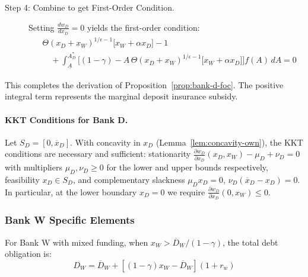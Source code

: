 \documentclass[12pt]{article}
\begin{document}
\begin{description}
    \item[Step 4: Combine to get First-Order Condition.]
    Setting $\frac{dw_{D}}{dx_{D}}=0$ yields the first-order condition:
    \begin{align}
    &\Theta(x_{D}+x_{W})^{1/\epsilon-1}\big[x_{W}+\alpha x_{D}\big] - 1 \\
    &\quad + \int_{\underline{A}}^{A_{D}^{*}}\Big[(1-\gamma) - A \, \Theta(x_{D}+x_{W})^{1/\epsilon-1}\big[x_{W}+\alpha x_{D}\big]\Big] f(A)\,dA 
    = 0
    \end{align}
\end{description}
This completes the derivation of Proposition~\ref{prop:bank-d-foc}. The positive integral term represents the marginal deposit insurance subsidy.

\paragraph{KKT Conditions for Bank D.}
Let $S_D=[0,\overline x_D]$. With concavity in $x_D$ (Lemma~\ref{lem:concavity-own}), the KKT conditions are necessary and sufficient: stationarity $\frac{\partial w_D}{\partial x_D}(x_D,x_W) - \mu_D + \nu_D = 0$ with multipliers $\mu_D,\nu_D\ge 0$ for the lower and upper bounds respectively, feasibility $x_D\in S_D$, and complementary slackness $\mu_D x_D=0$, $\nu_D(\overline x_D-x_D)=0$. In particular, at the lower boundary $x_D=0$ we require $\frac{\partial w_D}{\partial x_D}(0,x_W)\le 0$.

\subsubsection{Bank W Specific Elements}
For Bank W with mixed funding, when $x_{W} > \overline{D}_{W}/(1-\gamma)$, the total debt obligation is:
\begin{equation}
D_{W} = \overline{D}_{W} + [(1-\gamma)x_{W} - \overline{D}_{W}](1+r_{w})
\end{equation}
\end{document}
